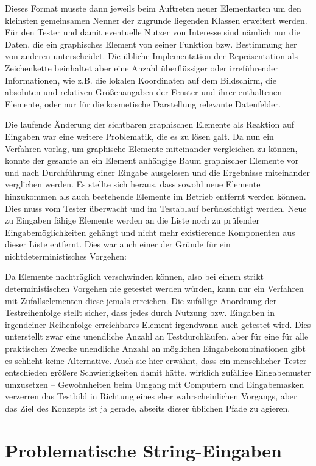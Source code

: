 Dieses Format musste dann jeweils beim Auftreten neuer Elementarten
um den kleinsten gemeinsamen Nenner der zugrunde liegenden Klassen
erweitert werden. Für den Tester und damit eventuelle Nutzer von
Interesse sind nämlich nur die Daten, die ein graphisches Element
von seiner Funktion bzw. Bestimmung her von anderen unterscheidet.
Die übliche Implementation der Repräsentation als Zeichenkette
beinhaltet aber eine Anzahl überflüssiger oder irreführender
Informationen, wie z.B. die lokalen Koordinaten auf dem Bildschirm,
die absoluten und relativen Größenangaben der Fenster und ihrer
enthaltenen Elemente, oder nur für die kosmetische Darstellung
relevante Datenfelder.

Die laufende Änderung der sichtbaren graphischen Elemente als Reaktion
auf Eingaben war eine weitere Problematik, die es zu lösen galt.
Da nun ein Verfahren vorlag, um graphische Elemente miteinander
vergleichen zu können, konnte der gesamte an ein Element anhängige Baum
graphischer Elemente vor und nach Durchführung einer Eingabe ausgelesen
und die Ergebnisse miteinander verglichen werden. Es stellte sich heraus,
dass sowohl neue Elemente hinzukommen als auch bestehende Elemente im
Betrieb entfernt werden können. Dies muss vom Tester überwacht und
im Testablauf berücksichtigt werden. Neue zu Eingaben fähige Elemente werden 
an die Liste noch zu prüfender Eingabemöglichkeiten gehängt und
nicht mehr existierende Komponenten aus dieser Liste entfernt. Dies war
auch einer der Gründe für ein nichtdeterministisches Vorgehen:

Da Elemente nachträglich verschwinden können, also bei einem strikt
deterministischen Vorgehen nie getestet werden würden, kann nur ein
Verfahren mit Zufallselementen diese jemals erreichen. Die zufällige
Anordnung der Testreihenfolge stellt sicher, dass jedes durch Nutzung 
bzw. Eingaben in irgendeiner Reihenfolge erreichbares Element
irgendwann auch getestet wird. Dies unterstellt zwar eine unendliche
Anzahl an Testdurchläufen, aber für eine für alle praktischen Zwecke
unendliche Anzahl an möglichen Eingabekombinationen gibt es schlicht
keine Alternative. Auch sie hier erwähnt, dass ein menschlicher Tester
entschieden größere Schwierigkeiten damit hätte, wirklich zufällige
Eingabemuster umzusetzen -- Gewohnheiten beim Umgang mit Computern
und Eingabemasken verzerren das Testbild in Richtung eines eher
wahrscheinlichen Vorgangs, aber das Ziel des Konzepts ist ja gerade,
abseits dieser üblichen Pfade zu agieren.


\section{Problematische String-Eingaben}\label{section:naughtystrings}


